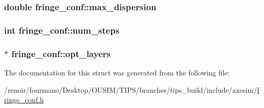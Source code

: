 \label{structfringe__conf_aa2e4fd8fec88650b18a12372ef85ba4b}
\hypertarget{structfringe__conf_ab903b587c97228de58c582f8c115cc85}{
\subsubsection[{max\_\-dispersion}]{\setlength{\rightskip}{0pt plus 5cm}double {\bf fringe\_\-conf::max\_\-dispersion}}}
\label{structfringe__conf_ab903b587c97228de58c582f8c115cc85}
\hypertarget{structfringe__conf_a0a5158dd39ecd3e68e88853f6b33014c}{
\subsubsection[{num\_\-steps}]{\setlength{\rightskip}{0pt plus 5cm}int {\bf fringe\_\-conf::num\_\-steps}}}
\label{structfringe__conf_a0a5158dd39ecd3e68e88853f6b33014c}
\hypertarget{structfringe__conf_a82eebf75b191ca25f824437be6f23c51}{
\subsubsection[{opt\_\-layers}]{$\ast$ {\bf fringe\_\-conf::opt\_\-layers}}}
\label{structfringe__conf_a82eebf75b191ca25f824437be6f23c51}


The documentation for this struct was generated from the following file:\begin{DoxyCompactItemize}
\item 
/renoir/fourmano/Desktop/OUSIM/TIPS/branches/tips\_\-build/include/axesim/\hyperlink{fringe__conf_8h}{fringe\_\-conf.h}\end{DoxyCompactItemize}
